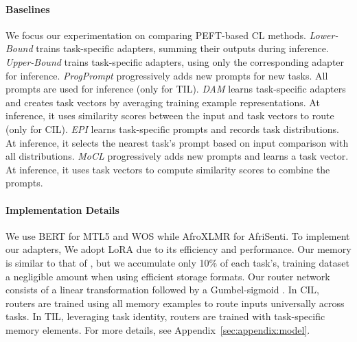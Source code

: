 \documentclass[11pt]{article}
\begin{document}
\paragraph{Baselines}
We focus our experimentation on comparing PEFT-based CL methods.
\textit{Lower-Bound} trains task-specific adapters, summing their outputs during inference.
\textit{Upper-Bound} trains task-specific adapters, using only the corresponding adapter for inference.
\textit{ProgPrompt} \cite{razdaibiedina2023progressive} progressively adds new prompts for new tasks. All prompts are used for inference (only for TIL).
\textit{DAM} \cite{cheng2024dynamic} learns task-specific adapters and creates task vectors by averaging training example representations. At inference, it uses similarity scores between the input and task vectors to route (only for CIL). 
\textit{EPI} \cite{wang-etal-2023-rehearsal} learns task-specific prompts and records task distributions. At inference, it selects the nearest task's prompt based on input comparison with all distributions.
\textit{MoCL} \cite{wang2024rehearsalfree} progressively adds new prompts and learns a task vector. At inference, it uses task vectors to compute similarity scores to combine the prompts.

\paragraph{Implementation Details}

We use BERT \cite{devlin-etal-2019-bert} for MTL5 and WOS while AfroXLMR \cite{alabi-etal-2022-adapting} for AfriSenti. To implement our adapters, We adopt LoRA \cite{hu2022lora} due to its efficiency and performance.
Our memory is similar to that of \cite{NEURIPS2019_f8d2e80c}, but we accumulate only 10\% of each task's, training dataset %
a negligible amount when using efficient storage formats.
Our router network consists of a linear transformation followed by a Gumbel-sigmoid \cite{maddison2017the}. 
In CIL, routers are trained using all memory examples to route inputs universally across tasks. In TIL, leveraging task identity, routers are trained with task-specific memory elements. For more details, see Appendix~\ref{sec:appendix:model}.
\end{document}
